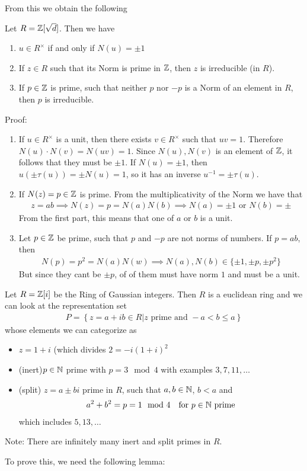 From this we obtain the following
\begin{lemma}[]
	Let $R = \mathbb{Z}[\sqrt{d}]$. Then we have
	\begin{enumerate}
		\item $u \in R^{\times}$ if and only if $N(u) = \pm 1$
		\item If $z \in R$ such that its Norm is prime in $\mathbb{Z}$, then $z$ is irreducible (in $R$).
		\item If $p \in \mathbb{Z}$ is prime, such that neither $p$ nor $-p$ is a Norm of an element in $R$, then $p$ is irreducible.
	\end{enumerate}
\end{lemma}
Proof: 
\begin{enumerate}
	\item If $u \in R^{\times}$ is a unit, then there exists $v \in R^{\times}$ such that $uv = 1$. Therefore $N(u) \cdot N(v) = N(uv) = 1$. Since $N(u), N(v)$ is an element of $\mathbb{Z}$, it follows that they must be $\pm 1$.
		If $N(u) = \pm 1$, then $u(\pm \tau(u)) = \pm N(u)= 1$, so it has an inverse $u^{-1} = \pm\tau(u)$.
	\item If $N(z) = p \in \mathbb{Z}$ is prime. From the multiplicativity of the Norm we have that
		\begin{align*}
			z = ab \implies N(z) = p = N(a) N(b) \implies N(a) = \pm 1 \text{ or } N(b) = \pm
		\end{align*}
		From the first part, this means that one of $a$ or $b$ is a unit.

	\item Let $p \in \mathbb{Z}$ be prime, such that $p$ and $-p$ are not norms of numbers. If $p = ab$, then 
		\begin{align*}
			N(p) = p^2 = N(a) N(w) \implies N(a), N(b) \in \{\pm 1, \pm p, \pm p^2\}
		\end{align*}
		But since they cant be $\pm p$, of of them must have norm $1$ and must be a unit.
\end{enumerate}

\begin{theorem}
	Let $R = \mathbb{Z}[i]$ be the Ring of Gaussian integers. Then $R$ is a euclidean ring and we can look at the representation set
	\begin{align*}
		P = \left\{z = a + ib \in R \big\vert z \text{ prime and } -a < b \leq a\right\}
	\end{align*}
	whose elements we can categorize as
	\begin{itemize}
		\item 	$z = 1 + i$ (which divides $2 = -i(1 + i)^2$
		\item (inert)$p \in \mathbb{N}$ prime with $p = 3 \mod 4$ with examples $3,7,11, \ldots$
		\item (split) $z = a \pm bi$ prime in $R$, such that $a,b \in \mathbb{N}$, $b < a$ and
			\begin{align*}
				a^2 + b^2 = p = 1 \mod 4 \quad \text{for $p \in \mathbb{N}$ prime}
			\end{align*}
			which includes $5,13, \ldots$
	\end{itemize}
Note: There are infinitely many inert and split primes in $R$.
\end{theorem}
To prove this, we need the following lemma:

